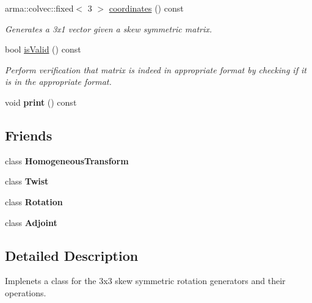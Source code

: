 \begin{DoxyCompactItemize}
\item 
arma\+::colvec\+::fixed$<$ 3 $>$ \hyperlink{class_skew_a2ec70266d6a21bfb410787ca74bfc04b}{coordinates} () const 
\begin{DoxyCompactList}\small\item\em Generates a 3x1 vector given a skew symmetric matrix. \end{DoxyCompactList}\item 
\hypertarget{class_skew_ae39506ad700f9e41abd8adc1d736565a}{bool \hyperlink{class_skew_ae39506ad700f9e41abd8adc1d736565a}{is\+Valid} () const }\label{class_skew_ae39506ad700f9e41abd8adc1d736565a}

\begin{DoxyCompactList}\small\item\em Perform verification that matrix is indeed in appropriate format by checking if it is in the appropriate format. \end{DoxyCompactList}\item 
\hypertarget{class_skew_a74d1c39c5b63456bd92f174b439a312f}{void {\bfseries print} () const }\label{class_skew_a74d1c39c5b63456bd92f174b439a312f}

\end{DoxyCompactItemize}
\subsection*{Friends}
\begin{DoxyCompactItemize}
\item 
\hypertarget{class_skew_aa5999bd564ccacef1b18765d5220f58d}{class {\bfseries Homogeneous\+Transform}}\label{class_skew_aa5999bd564ccacef1b18765d5220f58d}

\item 
\hypertarget{class_skew_a5372d90dc99e27198192a07365c7e09e}{class {\bfseries Twist}}\label{class_skew_a5372d90dc99e27198192a07365c7e09e}

\item 
\hypertarget{class_skew_aa9d2bf0f1d1d2655fb37b513d3159be3}{class {\bfseries Rotation}}\label{class_skew_aa9d2bf0f1d1d2655fb37b513d3159be3}

\item 
\hypertarget{class_skew_a22c177c74e1b9759be2a123b988235d5}{class {\bfseries Adjoint}}\label{class_skew_a22c177c74e1b9759be2a123b988235d5}

\end{DoxyCompactItemize}


\subsection{Detailed Description}
Implenets a class for the 3x3 skew symmetric rotation generators and their operations. 

